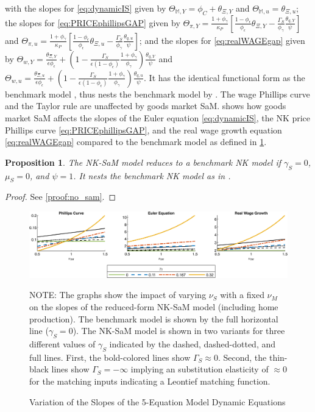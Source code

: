 \documentclass[12pt,3p,authoryear,review]{elsarticle}
\newtheorem{prop}{Proposition}
\begin{document}
with the slopes for \eqref{eq:dynamicIS} given by $\Theta_{\mathbb{M},Y} = \phi_C + \theta_{\Xi,Y}$ and $\Theta_{\mathbb{M},u} = \theta_{\Xi,u}$; the slopes for \eqref{eq:PRICEphillipsGAP} given by $\Theta_{\pi,Y} = \frac{1+\phi_\gamma}{\kappa_P} \left[ \frac{1-\phi_\epsilon}{\phi_\epsilon} \theta_{\Xi,Y} - \frac{\Gamma_S}{\phi_\gamma} \frac{\theta_{q,Y}}{\psi} \right]$ and $\Theta_{\pi,u} = \frac{1+\phi_\gamma}{\kappa_P} \left[ \frac{1-\phi_\epsilon}{\phi_\epsilon} \theta_{\Xi,u} - \frac{\Gamma_S}{\phi_\gamma} \frac{\theta_{q,u}}{\psi} \right]$; and the slopes for \eqref{eq:realWAGEgap} given by $\Theta_{w,Y} = \frac{\theta_{\Xi,Y}}{\epsilon\phi_\epsilon}+\left(1-\frac{\Gamma_S}{\epsilon\left(1-\phi_\epsilon\right)}\frac{1+\phi_\gamma}{\phi_\gamma}\right)\frac{\theta_{q,Y}}{\psi}$ and $\Theta_{w,u} = \frac{\theta_{\Xi,u}}{\epsilon\phi_\epsilon}+\left(1-\frac{\Gamma_S}{\epsilon\left(1-\phi_\epsilon\right)}\frac{1+\phi_\gamma}{\phi_\gamma}\right)\frac{\theta_{q,u}}{\psi}$. It has the identical functional form as the benchmark model \citep{ercegOptimalMonetaryPolicy2000,gali2011unemployment}, thus nests the benchmark model by . The wage Phillips curve and the Taylor rule are unaffected by goods market SaM.  shows how goods market SaM affects the slopes of the Euler equation \eqref{eq:dynamicIS}, the NK price Phillips curve \eqref{eq:PRICEphillipsGAP}, and the real wage growth equation \eqref{eq:realWAGEgap} compared to the benchmark model as defined in \cref{prop:nosam}.%
\begin{prop}\label{prop:nosam}%
	The NK-SaM model reduces to a benchmark NK model if $\gamma_S=0$, $\mu_S=0$, and $\psi=1$. It nests the benchmark NK model as in \cite{ercegOptimalMonetaryPolicy2000}.%
\end{prop}%
\begin{proof}%
	See \ref{proof:no_sam}.%
\end{proof}%
\begin{figure}[t]%
	\centering%
	\caption{Variation of the Slopes of the 5-Equation Model Dynamic Equations}\label{fig:slopes_5eq}%
	\includegraphics[width=\textwidth]{fig_3_slopes_5eq_asad_okun.png}\\%
	{\tiny \singlespacing NOTE: The graphs show the impact of varying $\nu_S$ with a fixed $\nu_M$ on the slopes of the reduced-form NK-SaM model (including home production). The benchmark model is shown by the full horizontal line ($\gamma_S=0$). The NK-SaM model is shown in two variants for three different values of $\gamma_S$ indicated by the dashed, dashed-dotted, and full lines. First, the bold-colored lines show $\Gamma_S\approx 0$. Second, the thin-black lines show $\Gamma_S=-\infty$ implying an substitution elasticity of $\approx 0$ for the matching inputs indicating a Leontief matching function.\par}%
\end{figure}%
\end{document}
